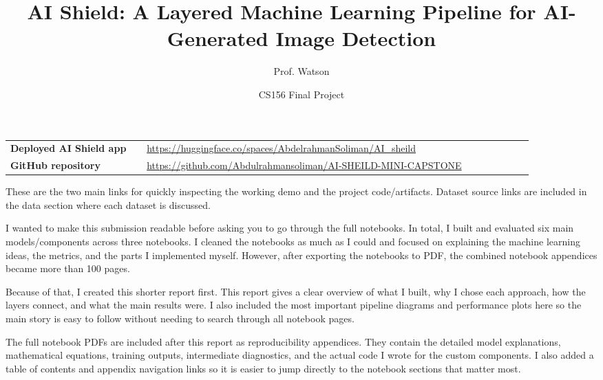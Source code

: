 \documentclass[11pt]{article}
\title{\textbf{AI Shield: A Layered Machine Learning Pipeline for AI-Generated Image Detection}}
\author{Prof. Watson}
\date{CS156 Final Project}
\newcommand{\deploymenturl}{https://huggingface.co/spaces/AbdelrahmanSoliman/AI_sheild}
\newcommand{\repourl}{https://github.com/Abdulrahmansoliman/AI-SHEILD-MINI-CAPSTONE}
\begin{document}
\maketitle
{}

\begin{tcolorbox}[
    enhanced,
    colback=green!4,
    colframe=green!45!black,
    title=\textbf{Project Links},
    fonttitle=\bfseries,
    boxrule=0.9pt,
    arc=2mm,
    left=3mm,
    right=3mm,
    top=2mm,
    bottom=2mm
]
\begin{tabular}{p{0.24\linewidth}p{0.68\linewidth}}
\textbf{Deployed AI Shield app} &
\href{\deploymenturl}{\url{\deploymenturl}} \\
\textbf{GitHub repository} &
\href{\repourl}{\url{\repourl}} \\
\end{tabular}

\vspace{0.2em}
These are the two main links for quickly inspecting the working demo and the project code/artifacts. Dataset source links are included in the data section where each dataset is discussed.
\end{tcolorbox}

\begin{tcolorbox}[
    enhanced,
    colback=blue!5,
    colframe=blue!65!black,
    coltitle=white,
    title=\textbf{Important Reader Note},
    fonttitle=\bfseries\large,
    boxrule=1.2pt,
    arc=3mm,
    left=3mm,
    right=3mm,
    top=3mm,
    bottom=3mm,
    attach boxed title to top left={xshift=3mm,yshift=-2mm},
    boxed title style={
        colback=blue!65!black,
        colframe=blue!65!black,
        arc=2mm,
        left=2mm,
        right=2mm
    }
]

I wanted to make this submission readable before asking you to go through the full notebooks. In total, I built and evaluated six main models/components across three notebooks. I cleaned the notebooks as much as I could and focused on explaining the machine learning ideas, the metrics, and the parts I implemented myself. However, after exporting the notebooks to PDF, the combined notebook appendices became more than 100 pages.

Because of that, I created this shorter report first. This report gives a clear overview of what I built, why I chose each approach, how the layers connect, and what the main results were. I also included the most important pipeline diagrams and performance plots here so the main story is easy to follow without needing to search through all notebook pages.

The full notebook PDFs are included after this report as reproducibility appendices. They contain the detailed model explanations, mathematical equations, training outputs, intermediate diagnostics, and the actual code I wrote for the custom components. I also added a table of contents and appendix navigation links so it is easier to jump directly to the notebook sections that matter most.

\end{tcolorbox}
\end{document}
